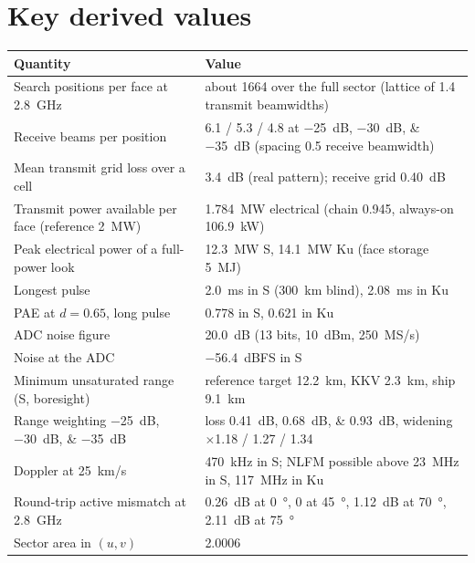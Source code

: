 \documentclass[11pt,a4paper]{article}
\begin{document}
\section{Key derived values}
\begin{center}
\begin{tabularx}{\linewidth}{@{}lL@{}}
\toprule
Quantity & Value\\
\midrule
Search positions per face at \SI{2.8}{GHz} & about \num{1664} over the full sector (lattice of 1.4 transmit
beamwidths)\\
Receive beams per position & 6.1 / 5.3 / 4.8 at \SIlist{-25;-30;-35}{dB} (spacing 0.5 receive beamwidth)\\
Mean transmit grid loss over a cell & \SI{3.4}{dB} (real pattern); receive grid \SI{0.40}{dB}\\
Transmit power available per face (reference \SI{2}{MW}) & \SI{1.784}{MW} electrical (chain 0.945, always-on
\SI{106.9}{kW})\\
Peak electrical power of a full-power look & \SI{12.3}{MW} S, \SI{14.1}{MW} Ku (face storage \SI{5}{MJ})\\
Longest pulse & \SI{2.0}{ms} in S (\SI{300}{km} blind), \SI{2.08}{ms} in Ku\\
PAE at $d=0.65$, long pulse & 0.778 in S, 0.621 in Ku\\
ADC noise figure & \SI{20.0}{dB} (13 bits, \SI{+10}{dBm}, \SI{250}{MS/s})\\
Noise at the ADC & \SI{-56.4}{dBFS} in S\\
Minimum unsaturated range (S, boresight) & reference target \SI{12.2}{km}, KKV \SI{2.3}{km}, ship \SI{9.1}{km}\\
Range weighting \SIlist{-25;-30;-35}{dB} & loss \SIlist{0.41;0.68;0.93}{dB}, widening $\times$1.18 / 1.27 / 1.34\\
Doppler at \SI{25}{km/s} & \SI{470}{kHz} in S; NLFM possible above \SI{23}{MHz} in S, \SI{117}{MHz} in Ku\\
Round-trip active mismatch at \SI{2.8}{GHz} & \SI{0.26}{dB} at \SI{0}{\degree}, 0 at \SI{45}{\degree},
\SI{1.12}{dB} at \SI{70}{\degree}, \SI{2.11}{dB} at \SI{75}{\degree}\\
Sector area in $(u,v)$ & 2.0006\\
\bottomrule
\end{tabularx}
\end{center}

\end{document}
